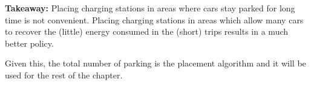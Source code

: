 \textbf{Takeaway:} Placing charging stations in areas where cars stay parked for long time is not convenient. Placing charging stations in areas which allow many cars to recover the (little) energy consumed in the (short) trips results in a much better policy.

Given this, the total number of parking is the placement algorithm and it will be used for the rest of the chapter. 

